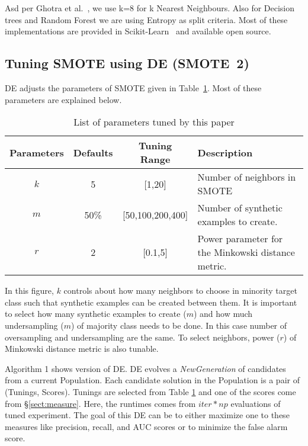 \documentclass[sigconf,review, anonymous]{acmart}
\theoremstyle{break}
\newcommand{\tion}[1]{{\S}\ref{sect:#1}}
\begin{document}
Asd per Ghotra et al.~\cite{ghotra2015revisiting}, we use k=8 for k Nearest Neighbours. Also for Decision trees and Random Forest we are using Entropy as split criteria. Most of these implementations are provided in Scikit-Learn~\cite{pedregosa2011scikit} and available open source.

\subsection{\textbf{Tuning SMOTE using DE (SMOTE~2)}}
\label{sect:tuning}

DE  adjusts the parameters of SMOTE given in
Table~\ref{tb:tuned}. Most of these parameters are explained below. 

\begin{table}[!htbp]
    \begin{center}
\scriptsize
\begin{tabular}{|c|c|c|p{3.5cm}|}
        \hline 
        \textbf{Parameters} & \textbf{Defaults} & \textbf{Tuning Range} & \textbf{Description}\\
        \hline
        $k$ & 5 & [1,20] & Number of neighbors in SMOTE \\ 
        \hline
       $m$ & 50\% & [50,100,200,400] & Number of synthetic examples to create. \\ 
        \hline
        $r$ & 2 & [0.1,5] & Power parameter for the Minkowski distance metric.\\

        \hline
\end{tabular}
\end{center}
\caption{List of parameters tuned by this paper}
\label{tb:tuned}
\end{table}
 
In this figure, $k$ controls about how many neighbors to choose in minority target class such that synthetic examples can be created between them. It is important to select how many synthetic examples to create ($m$) and how much undersampling ($m$) of majority class needs to be done. In this case number of oversampling and undersampling are the same. To select neighbors, power ($r$) of Minkowski distance metric is also tunable.

Algorithm 1 shows version of DE.  DE evolves a \textit{NewGeneration} of
candidates from a current Population.   Each candidate solution in the Population is a pair of
(Tunings, Scores). Tunings are selected from Table \ref{tb:tuned} and one of the scores
come from \tion{measure}. Here, the runtimes comes from $\mathit{iter} * np $ evaluations of tuned experiment. The goal of this DE can be to either maximize one to these measures like precision, recall, and AUC scores or to minimize the false alarm score.
\end{document}
